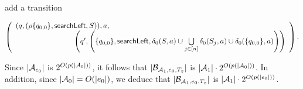 \begin{enumerate}
\begin{itemize}
\medskip

add a transition

\medskip
		$\left(
		\begin{array}{l l}
		(q, (\rho \{q_{0,0}\}, \searchleft, S)), a, &\\
		& \hspace{-2cm} \left(q', \left(\{q_{0,0}\}, \searchleft, \delta_0(S,a) \cup \bigcup \limits_{j \in [n]} \delta_0(S_j, a) \cup \delta_0(\{q_{0,0}\}, a) \right)\right)
		\end{array}
		\right).$
\medskip

\end{itemize}
\end{enumerate}
Since $|\mathcal{A}_{e_0}|$ is $2^{O(p(|\mathcal{A}_0|))}$, it follows that $|\mathcal{B}_{\mathcal{A}_1, e_0, T_z}|$ is $|\mathcal{A}_1| \cdot 2^{O(p(|\mathcal{A}_0|))}$. In addition, since $|\mathcal{A}_0|=O(|e_0|)$, we deduce that $|\mathcal{B}_{\mathcal{A}_1, e_0, T_z}|$ is $|\mathcal{A}_1| \cdot 2^{O(p(|e_0|))}$.

